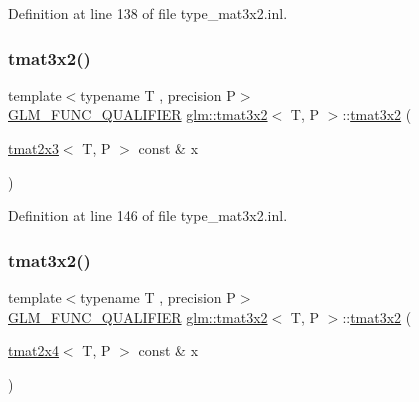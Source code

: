 Definition at line 138 of file type\+\_\+mat3x2.\+inl.

\mbox{\label{structglm_1_1tmat3x2_a1befb2e603dab6356eaf74504fa6bdfe}} 
\subsubsection{\texorpdfstring{tmat3x2()}{tmat3x2()}\hspace{0.1cm}{\footnotesize\ttfamily [14/22]}}
{\footnotesize\ttfamily template$<$typename T , precision P$>$ \\
\mbox{\hyperlink{setup_8hpp_a33fdea6f91c5f834105f7415e2a64407}{G\+L\+M\+\_\+\+F\+U\+N\+C\+\_\+\+Q\+U\+A\+L\+I\+F\+I\+ER}} \mbox{\hyperlink{structglm_1_1tmat3x2}{glm\+::tmat3x2}}$<$ T, P $>$\+::\mbox{\hyperlink{structglm_1_1tmat3x2}{tmat3x2}} (\begin{DoxyParamCaption}\item[{\mbox{\hyperlink{structglm_1_1tmat2x3}{tmat2x3}}$<$ T, P $>$ const \&}]{x }\end{DoxyParamCaption})}



Definition at line 146 of file type\+\_\+mat3x2.\+inl.

\mbox{\label{structglm_1_1tmat3x2_abc4f2fcc9002757744b440948ad516ce}} 
\subsubsection{\texorpdfstring{tmat3x2()}{tmat3x2()}\hspace{0.1cm}{\footnotesize\ttfamily [15/22]}}
{\footnotesize\ttfamily template$<$typename T , precision P$>$ \\
\mbox{\hyperlink{setup_8hpp_a33fdea6f91c5f834105f7415e2a64407}{G\+L\+M\+\_\+\+F\+U\+N\+C\+\_\+\+Q\+U\+A\+L\+I\+F\+I\+ER}} \mbox{\hyperlink{structglm_1_1tmat3x2}{glm\+::tmat3x2}}$<$ T, P $>$\+::\mbox{\hyperlink{structglm_1_1tmat3x2}{tmat3x2}} (\begin{DoxyParamCaption}\item[{\mbox{\hyperlink{structglm_1_1tmat2x4}{tmat2x4}}$<$ T, P $>$ const \&}]{x }\end{DoxyParamCaption})}



